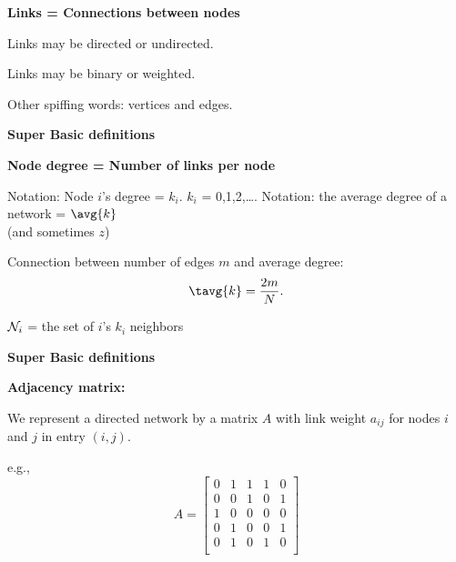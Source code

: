   

  \textbf{\alert{Links} = Connections between nodes}
    
    
      \alert{Links} may be directed or undirected.
    
      \alert{Links} may be binary or weighted.
    
  

  {
    Other spiffing words: vertices and edges.
  }


  \textbf{Super Basic definitions}

  \textbf{\alert{Node degree} = Number of links per node}
    
     Notation: Node $i$'s degree = $k_i$.
     $k_i$ = 0,1,2,\ldots.
     Notation: the average degree of a network = $\avg{k}$ \\
      {(and sometimes $z$)}
    
      Connection between number of edges $m$ and average degree:
      $$
      \tavg{k} = \frac{2m}{N}.
      $$
    
       ${\cal N}_i$ = the set of $i$'s $k_i$ neighbors
    
  


  \textbf{Super Basic definitions}

  \textbf{Adjacency matrix:}
    
    
      We represent a directed network by a 
      matrix $A$ with link weight $a_{ij}$ for nodes $i$ and $j$
      in entry $(i,j)$.
    
      e.g.,
      $$
      A = \left[
        \begin{array}{ccccc}
          0 & 1 & 1 & 1 & 0\\
          0 & 0 & 1 & 0 & 1\\
          1 & 0 & 0 & 0 & 0 \\
          0 & 1 & 0 & 0 & 1 \\
          0 & 1 & 0 & 1 & 0 \\
        \end{array}
      \right]
      $$
    
